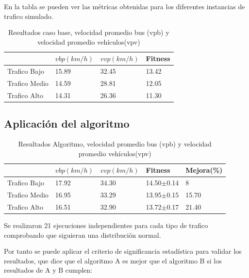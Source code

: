 En la tabla se pueden ver las métricas obtenidas para los diferentes instancias de trafico simulado.
 
 \begin{table}[h]
 	\renewcommand{\arraystretch}{1.2}
 	\caption{Resultados caso base, velocidad promedio bus (vpb) y velocidad promedio vehículos(vpv) }
 	\label{table:resultado_caso_base}
 	\centering
 	\begin{tabular}{p{2.5cm}p{2.5cm}p{2.5cm}p{2cm} }
 		\hline
 		&
 		$vbp(km/h)$& 
 		$vvp(km/h)$ & 
 		Fitness \\ 
 		\hline
 		Trafico Bajo & 15.89  & 32.45& 13.42\\
 		Trafico Medio & 14.59  & 28.81& 12.05\\
 		Trafico Alto & 14.31  & 26.36& 11.30\\

 		\hline
 	\end{tabular}
 \end{table}


\subsection{Aplicación del algoritmo}


\begin{table}[h]
	\renewcommand{\arraystretch}{1.2}
	\caption{Resultados Algoritmo, velocidad promedio bus (vpb) y velocidad promedio vehículos(vpv) }
	\label{table:resultado_caso_algoritmo}
	\centering
	\begin{tabular}{p{2.5cm}p{2.5cm}p{2.5cm}p{2cm}p{2cm} }
		\hline
		&
		$vbp(km/h)$& 
		$vvp(km/h)$ & 
		Fitness &
		Mejora(\%)
		\\ 
		\hline
		Trafico Bajo & 17.92  & 34.30& 14.50$\pm$0.14 & 8\\
		Trafico Medio & 16.95  & 33.29& 13.95$\pm$0.15 & 15.70\\
		Trafico Alto & 16.51  & 32.90& 13.72$\pm$0.17 & 21.40\\
		
		\hline
	\end{tabular}
\end{table}

Se realizaron 21 ejecuciones independientes para cada tipo de trafico comprobando que siguieran una distribución normal.

Por tanto se puede aplicar el criterio de significancia estadística para validar los resultados, que dice que el
algoritmo A es mejor que el algoritmo B si los resultados de A y B cumplen:


